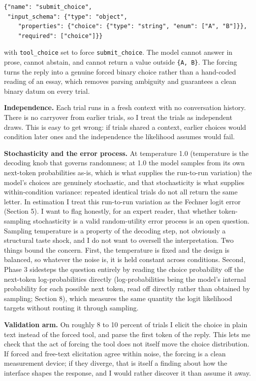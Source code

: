 \documentclass[11pt]{article}
\begin{document}
\begin{lstlisting}[style=schema]
{"name": "submit_choice",
 "input_schema": {"type": "object",
    "properties": {"choice": {"type": "string", "enum": ["A", "B"]}},
    "required": ["choice"]}}
\end{lstlisting}

with \texttt{tool\_choice} set to force \texttt{submit\_choice}. The model cannot answer in prose,
cannot abstain, and cannot return a value outside \texttt{\{A, B\}}. The forcing turns the reply
into a genuine forced binary choice rather than a hand-coded reading of an essay, which removes
parsing ambiguity and guarantees a clean binary datum on every trial.

\textbf{Independence.} Each trial runs in a fresh context with no conversation history. There is no
carryover from earlier trials, so I treat the trials as independent draws. This is easy to get
wrong: if trials shared a context, earlier choices would condition later ones and the independence
the likelihood assumes would fail.

\textbf{Stochasticity and the error process.} At temperature 1.0 (temperature is the decoding knob
that governs randomness; at 1.0 the model samples from its own next-token probabilities as-is,
which is what supplies the run-to-run variation) the model's choices are genuinely
stochastic, and that stochasticity is what supplies within-condition variance: repeated identical
trials do not all return the same letter. In estimation I treat this run-to-run variation as the
Fechner logit error (Section 5). I want to flag honestly, for an expert reader, that whether
token-sampling stochasticity is a valid random-utility error process is an open question. Sampling
temperature is a property of the decoding step, not obviously a structural taste shock, and I do
not want to oversell the interpretation. Two things bound the concern. First, the temperature is
fixed and the design is balanced, so whatever the noise is, it is held constant across conditions.
Second, Phase 3 sidesteps the question entirely by reading the choice probability off the
next-token log-probabilities directly (log-probabilities being the model's internal probability for
each possible next token, read off directly rather than obtained by sampling; Section 8), which
measures the same quantity the logit likelihood targets without routing it through sampling.

\textbf{Validation arm.} On roughly 8 to 10 percent of trials I elicit the choice in plain text
instead of the forced tool, and parse the first token of the reply. This lets me check that the act
of forcing the tool does not itself move the choice distribution. If forced and free-text
elicitation agree within noise, the forcing is a clean measurement device; if they diverge, that is
itself a finding about how the interface shapes the response, and I would rather discover it than
assume it away.
\end{document}

